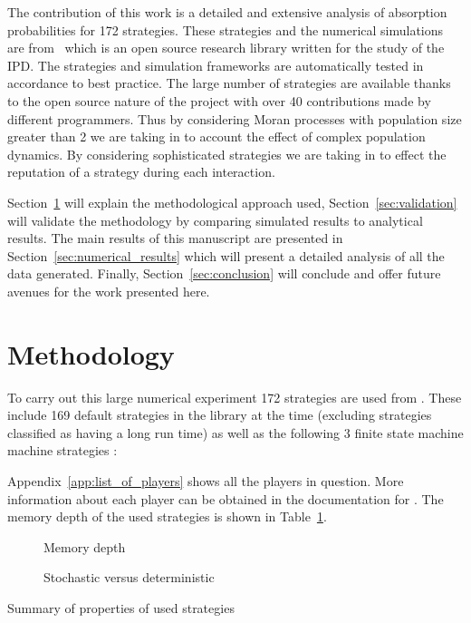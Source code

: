 \documentclass{article}
\begin{document}
The contribution of this work is a detailed and extensive analysis of absorption
probabilities for 172 strategies. These strategies and the numerical simulations
are from~\cite{axelrodproject} which is an open source research library written
for the study of the IPD\@. The strategies and simulation frameworks are
automatically tested in accordance to best practice. The large number of
strategies are available thanks to the open source nature of the project with
over 40 contributions made by different programmers. Thus by considering Moran
processes with population size greater than 2 we are taking in to account the
effect of complex population dynamics. By considering sophisticated strategies
we are taking in to effect the reputation of a strategy during each interaction.

Section~\ref{sec:methodology} will explain the methodological approach used,
Section~\ref{sec:validation} will validate the methodology by comparing
simulated results to analytical results. The main results of this manuscript are
presented in Section~\ref{sec:numerical_results} which will present a detailed
analysis of all the data generated. Finally, Section~\ref{sec:conclusion} will
conclude and offer future avenues for the work presented here.

\section{Methodology}\label{sec:methodology}

To carry out this large numerical experiment 172 strategies are used from
\cite{axelrodproject}. These include 169 default strategies in the library at
the time (excluding strategies classified as having a long run time) as well as
the following 3 finite state machine machine strategies \cite{Ashlock2006}:


Appendix~\ref{app:list_of_players} shows all the players in question. More
information about each player can be obtained in the documentation for
\cite{axelrodproject}. The memory depth of the used strategies is shown in
Table~\ref{tbl:memory_depth_count}.

\begin{table}[!hbtp]
    \centering
        \begin{subfigure}[t]{\textwidth}
            \centering
                
                \caption{Memory depth}
                \label{tbl:memory_depth_count}
        \end{subfigure}
        \vspace{.5cm}

        \begin{subfigure}[t]{\textwidth}
            \centering
                
                \caption{Stochastic versus deterministic}
                \label{tbl:stochastic_count}
        \end{subfigure}
        \caption{Summary of properties of used strategies}
\end{table}
\end{document}
